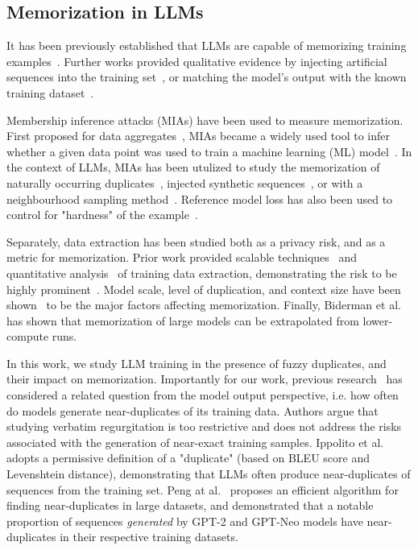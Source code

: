 
\subsection{Memorization in LLMs}

It has been previously established that LLMs are capable of memorizing training examples~\cite{song2017machine, yeom2018privacy}. Further works provided qualitative evidence by injecting artificial sequences into the training set~\cite{carlini2019secret, henderson2018ethical, thakkar2020understanding}, or matching the model's output with the known training dataset~\cite{carlini2021extracting}.

Membership inference attacks (MIAs) have been used to measure memorization. First proposed for data aggregates~\cite{homer2008resolving}, MIAs became a widely used tool to infer whether a given data point was used to train a machine learning (ML) model~\cite{shokri2017membership, sablayrolles2019white, nasr2018comprehensive}. In the context of LLMs, MIAs has been utulized to study the memorization of naturally occurring duplicates~\cite{kandpal2022deduplicating}, injected synthetic sequences~\cite{meeus2024copyright}, or with a neighbourhood sampling method~\cite{mattern2023membership}. Reference model loss has also been used to control for "hardness" of the example~\cite{kandpal2022deduplicating, duan2024membership}.

Separately, data extraction has been studied both as a privacy risk, and as a metric for memorization. Prior work provided scalable techniques~\cite{nasr2023scalable} and quantitative analysis~\cite{carlini2022quantifying} of training data extraction, demonstrating the risk to be highly prominent~\cite{lukas2023analyzing, mireshghallah2023can, zhang2023make, bordt2024elephants}. Model scale, level of duplication, and context size have been shown~\cite{kandpal2022deduplicating, carlini2022quantifying} to be the major factors affecting memorization. Finally, Biderman et al.~\cite{biderman2024emergent} has shown that memorization of large models can be extrapolated from lower-compute runs.

In this work, we study LLM training in the presence of fuzzy duplicates, and their impact on memorization. Importantly for our work, previous research~\cite{ippolito2022preventing, peng2023near} has considered a related question from the model output perspective, i.e. how often do models generate near-duplicates of its training data. Authors argue that studying verbatim regurgitation is too restrictive and does not address the risks associated with the generation of near-exact training samples. Ippolito et al.~\cite{ippolito2022preventing} adopts a permissive definition of a "duplicate" (based on BLEU score and Levenshtein distance), demonstrating that LLMs often produce near-duplicates of sequences from the training set. Peng at al.~\cite{peng2023near} proposes an efficient algorithm for finding near-duplicates in large datasets, and demonstrated that a notable proportion of sequences \emph{generated} by GPT-2 and GPT-Neo models have near-duplicates in their respective training datasets.

